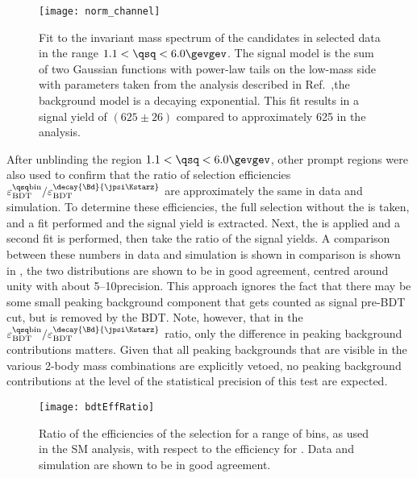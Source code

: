 \begin{figure}
  \begin{center}
    \texttt{[image: norm\_channel]}
    \caption[Fit to the normalization channel, \btokstrmumu in the range $1.1<\qsq<6.0\gevgev$]
    {
      Fit to the invariant mass spectrum of the \Bd candidates in selected data in the range
      $1.1<\qsq<6.0\gevgev$.
      The signal model is the sum of two Gaussian functions with power-law tails on the low-mass
      side with parameters taken from the analysis described in
      Ref.~\protect\cite{LHCb-CONF-2015-002},the background model is a decaying exponential.
      This fit results in a signal yield of $(625\pm26)$ compared to approximately 625 in the \sm
      analysis.
    }
    \label{fig:db:norm}
  \end{center}
\end{figure}

After unblinding the region $1.1<\qsq<6.0\gevgev$, other prompt \qsq regions were also used to
confirm that the ratio of \bdt selection efficiencies
$\varepsilon_\mathrm{BDT}^\mathrm{\qsq bin} / \varepsilon_\mathrm{BDT}^{\decay{\Bd}{\jpsi\Kstarz}}$
are approximately the same in data and simulation.
To determine these efficiencies, the full selection without the \BDT is taken, and a fit performed
and the signal yield is extracted.
Next, the \BDT is applied and a second fit is performed, then take the ratio of the signal
yields.
A comparison between these numbers in data and simulation is shown in comparison is shown in
, the two distributions are shown to be in good agreement, centred around
unity with about 5--10\pc precision.
This approach ignores the fact that there may be some small peaking background component that gets
counted as signal pre-BDT cut, but is removed by the BDT.
Note, however, that in the
$\varepsilon_\mathrm{BDT}^\mathrm{\qsq bin} / \varepsilon_\mathrm{BDT}^{\decay{\Bd}{\jpsi\Kstarz}}$
ratio, only the difference in peaking background contributions matters.
Given that all peaking backgrounds that are visible in the various 2-body mass combinations are
explicitly vetoed, no peaking background contributions at the level of the statistical precision of
this test are expected.

\begin{figure}
  \begin{center}
    \texttt{[image: bdtEffRatio]}
    \caption{
      Ratio of the efficiencies of the \bdt selection for a range of \qsq bins, as used in the SM
      \btokstrmumu analysis, with respect to the efficiency for \decay{\Bd}{\jpsi\Kstarz}.
      Data and simulation are shown to be in good agreement.
    }
    \label{fig:bdtEffRatio}
  \end{center}
\end{figure}

